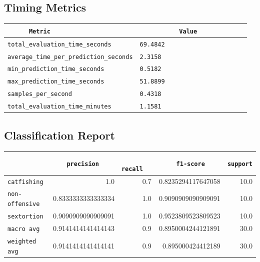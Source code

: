 \documentclass{article}
\begin{document}
\subsection{Timing Metrics}

\begin{center}
\begin{tabular}{l | l} \hline
    \verb|      Metric     | & \verb|           Value           | \\ \hline
    \hline
    \verb|total_evaluation_time_seconds| & \verb|69.4842                      | \\ \hline
    \verb|average_time_per_prediction_seconds| & \verb|2.3158                       | \\ \hline
    \verb|min_prediction_time_seconds| & \verb|0.5182                       | \\ \hline
    \verb|max_prediction_time_seconds| & \verb|51.8899                      | \\ \hline
    \verb|samples_per_second| & \verb|0.4318                       | \\ \hline
    \verb|total_evaluation_time_minutes| & \verb|1.1581                       | \\ \hline
\end{tabular}
\end{center}

\subsection{Classification Report}

\begin{center}
\begin{tabular}{l | r | r | r | r} \hline
    \verb|            | & \verb|    precision     | & \verb|      recall      | & \verb|     f1-score     | & \verb|support| \\ \hline
    \hline
    \verb|catfishing | & 1.0 & 0.7 & 0.8235294117647058 &    10.0 \\ \hline
    \verb|non-offensive| & 0.8333333333333334 & 1.0 & 0.9090909090909091 &    10.0 \\ \hline
    \verb|sextortion | & 0.9090909090909091 & 1.0 & 0.9523809523809523 &    10.0 \\ \hline
    \verb|macro avg  | & 0.9141414141414143 & 0.9 & 0.8950004244121891 &    30.0 \\ \hline
    \verb|weighted avg| & 0.9141414141414141 & 0.9 & 0.895000424412189 &    30.0 \\ \hline
\end{tabular}
\end{center}
\end{document}
